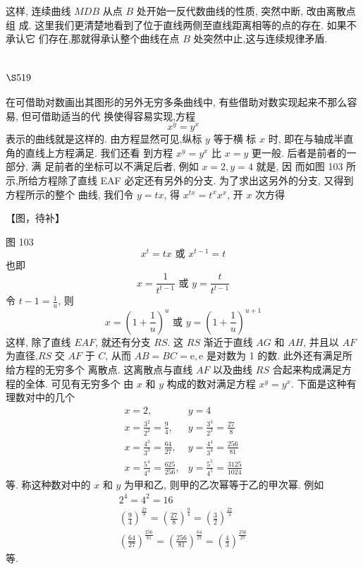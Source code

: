 这样, 连续曲线 $M D B$ 从点 $B$ 处开始一反代数曲线的性质, 突然中断, 改由离散点组 成. 这里我们更清楚地看到了位于直线两侧至直线距离相等的点的存在. 如果不承认它 们存在,那就得承认整个曲线在点 $B$ 处突然中止,这与连续规律矛盾.

\section{$\S 519$}

在可借助对数画出其图形的另外无穷多条曲线中, 有些借助对数实现起来不那么容易, 但可借助适当的代 换使得容易实现,方程
\[
x^{y}=y^{x}
\]
表示的曲线就是这样的. 由方程显然可见,纵标 $y$ 等于横 标 $x$ 时, 即在与轴成半直角的直线上方程满足. 我们还看 到方程 $x^{y}=y^{x}$ 比 $x=y$ 更一般. 后者是前者的一部分, 满 足前者的坐标可以不满足后者, 例如 $x=2, y=4$ 就是, 因 而如图 103 所示,所给方程除了直线 EAF 必定还有另外的分支. 为了求出这另外的分支, 又得到方程所示的整个 曲线, 我们令 $y=t x$, 得 $x^{t x}=t^{x} x^{x}$, 开 $x$ 次方得


【图，待补】

图 103 
\[
x^{t}=t x \text { 或 } x^{t-1}=t
\]
也即
\[
x=\frac{1}{t^{t-1}} \text { 或 } y=\frac{t}{t^{t-1}}
\]
令 $t-1=\frac{1}{u}$, 则
\[
x=\left(1+\frac{1}{u}\right)^{u} \text { 或 } y=\left(1+\frac{1}{u}\right)^{u+1}
\]
这样, 除了直线 $E A F$, 就还有分支 $R S$. 这 $R S$ 渐近于直线 $A G$ 和 $A H$, 并且以 $A F$ 为直径,$R S$ 交 $A F$ 于 $C$, 从而 $A B=B C=\mathrm{e}, \mathrm{e}$ 是对数为 1 的数. 此外还有满足所给方程的无穷多个 离散点. 这离散点与直线 $A F$ 以及曲线 $R S$ 合起来构成满足方程的全体. 可见有无穷多个 由 $x$ 和 $y$ 构成的数对满足方程 $x^{y}=y^{x}$. 下面是这种有理数对中的几个
\[
\begin{array}{cl}
x=2, & y=4 \\
x=\frac{3^{2}}{2^{2}}=\frac{9}{4}, & y=\frac{3^{3}}{2^{3}}=\frac{27}{8} \\
x=\frac{4^{3}}{3^{3}}=\frac{64}{27}, & y=\frac{4^{4}}{3^{4}}=\frac{256}{81} \\
x=\frac{5^{4}}{4^{4}}=\frac{625}{256}, & y=\frac{5^{5}}{4^{5}}=\frac{3125}{1024}
\end{array}
\]
等. 称这种数对中的 $x$ 和 $y$ 为甲和乙, 则甲的乙次幂等于乙的甲次幂. 例如
\[
\begin{gathered}
2^{4}=4^{2}=16 \\
\left(\frac{9}{4}\right)^{\frac{27}{8}}=\left(\frac{27}{8}\right)^{\frac{9}{4}}=\left(\frac{3}{2}\right)^{\frac{27}{4}} \\
\left(\frac{64}{27}\right)^{\frac{256}{81}}=\left(\frac{256}{81}\right)^{\frac{64}{27}}=\left(\frac{4}{3}\right)^{\frac{256}{27}}
\end{gathered}
\]
等.

